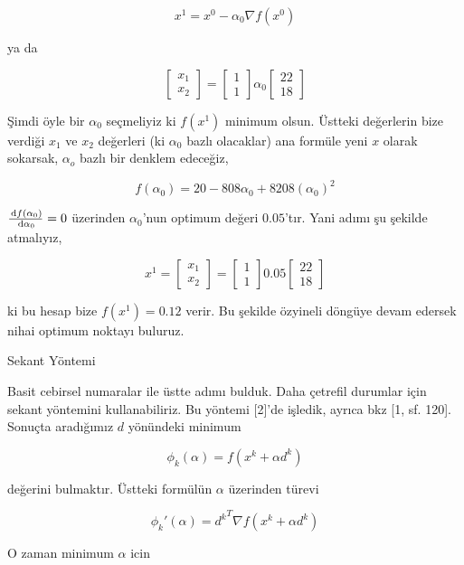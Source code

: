 \documentclass[12pt,fleqn]{article}\usepackage{../../common}
\begin{document}
$$
x^1 = x^0 - \alpha_0 \nabla f(x^0)
$$

ya da 

$$
\left[\begin{array}{c}
x_1 \\ x_2
\end{array}\right]
= 
\left[\begin{array}{c}
1 \\ 1
\end{array}\right]
\alpha_0 
\left[\begin{array}{c}
22 \\ 18
\end{array}\right]
$$

Şimdi öyle bir $\alpha_0$ seçmeliyiz ki $f(x^1)$ minimum olsun. Üstteki
değerlerin bize verdiği $x_1$ ve $x_2$ değerleri (ki $\alpha_0$ bazlı
olacaklar) ana formüle yeni $x$ olarak sokarsak, $\alpha_o$ bazlı bir
denklem edeceğiz,

$$
f(\alpha_0) = 20 - 808 \alpha_0 + 8208 (\alpha_0)^2
$$

$\frac{\,\mathrm{d} f(\alpha_0)}{\,\mathrm{d} \alpha_0} = 0$ üzerinden $\alpha_0$'nun optimum
değeri $0.05$'tır. Yani adımı şu şekilde atmalıyız,

$$
x^1 = 
\left[\begin{array}{c}
x_1 \\ x_2
\end{array}\right]
= 
\left[\begin{array}{c}
1 \\ 1
\end{array}\right]
0.05
\left[\begin{array}{c}
22 \\ 18
\end{array}\right]
$$

ki bu hesap bize $f(x^1) = 0.12$ verir. Bu şekilde özyineli döngüye devam
edersek nihai optimum noktayı buluruz.

Sekant Yöntemi

Basit cebirsel numaralar ile üstte adımı bulduk. Daha çetrefil durumlar
için sekant yöntemini kullanabiliriz. Bu yöntemi [2]'de işledik, ayrıca bkz
[1, sf. 120]. Sonuçta aradığımız $d$ yönündeki minimum

$$
\phi_k(\alpha) = f(x^k + \alpha d^k)
$$

değerini bulmaktır. Üstteki formülün $\alpha$ üzerinden türevi

$$
\phi_k'(\alpha) = {d^k}^T \nabla f(x^k + \alpha d^k) 
$$

O zaman minimum $\alpha$ icin 
\end{document}
